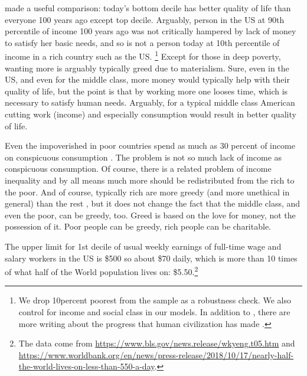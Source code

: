 \documentclass[10pt, letterpaper]{article}
\begin{document}
\begin{spacing}{1.8}
\citet{bok10} made a useful comparison: today's bottom decile has better quality of life than everyone 100 years ago except top decile. Arguably, person in the US at 90th percentile of income 100 years ago was
not critically hampered by lack of money to satisfy her basic needs, and so is
not a person today at 10th percentile of income in a rich country such as the US. 
\footnote{We drop 10percent poorest from the sample as a robustness check. We also
  control for income and social class in our models. In addition to
  \citet{bok10}, there are more writing about the progress that human
  civilization has made \citep[e.g.,][]{pinker18}.}
Except for those in deep poverty, wanting more is arguably typically greed due to materialism.
Sure, even in the US, and even for the middle class, more money would typically help
with their quality of life, but the point is that by working more one looses
time, which is necessary to satisfy human needs. Arguably, for a typical middle class
American cutting work (income) and especially consumption would result in better
quality of life.

Even the impoverished in poor countries spend as much as 30 percent of income on
conspicuous consumption \citep{banerjee11}. The problem is not so much lack of income as
conspicuous consumption. Of course, there is a related problem of income
inequality and by all means much more should be redistributed from the rich to
the poor. And of course, typically rich are more greedy (and more unethical in
general) than the rest \cite{piff17,piff14,piff12,piff10,kraus09}, but it does
not change the fact that the middle class, and even the poor, can be greedy, too.
%
Greed is based on the love for money, not the possession of it. Poor people can
be greedy, rich people can be charitable.

The upper limit for 1st decile of usual weekly earnings of full-time wage and
salary workers in the US is \$500 so about \$70 daily, which is more than 10
times of what half of the World population lives on: \$5.50.\footnote{The data come from \url{https://www.bls.gov/news.release/wkyeng.t05.htm} and \url{https://www.worldbank.org/en/news/press-release/2018/10/17/nearly-half-the-world-lives-on-less-than-550-a-day}.}   


\end{spacing}
\end{document}
